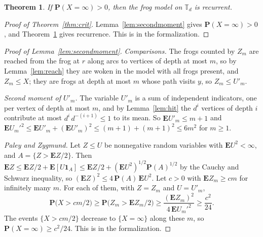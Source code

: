 \documentclass[11pt]{amsart}
\newtheorem{theorem}{Theorem}[section]
\theoremstyle{definition}
\numberwithin{equation}{section}
\newcommand{\lean}[1]{\ignorespaces}
\newcommand{\T}{\mathbb{T}}
\newcommand{\E}{\mathbf{E}}
\renewcommand{\P}{\mathbf{P}}
\newcommand{\one}{\mathbf{1}}
\begin{document}
\begin{theorem}\label{thm:Bzero}\lean{FrogModel.ZeroOne.recurrent_of_frozenCount}
If $\P(X=\infty)>0$, then the frog model on $\T_d$ is recurrent.
\end{theorem}

\begin{proof}[Proof of Theorem~\ref{thm:crit}]
Lemma~\ref{lem:secondmoment} gives $\P(X=\infty)>0$, and Theorem~\ref{thm:Bzero} gives recurrence. This is  in the formalization.
\end{proof}

\begin{proof}[Proof of Lemma~\ref{lem:secondmoment}]
\emph{Comparisons.} The frogs counted by $Z_m$ are reached from the frog at $r$ along arcs to vertices of depth at most $m$, so by Lemma~\ref{lem:reach} they are woken in the model with all frogs present, and $Z_m\le X$; they are frogs at depth at most $m$ whose path visits $y$, so $Z_m\le U'_m$.

\emph{Second moment of $U'_m$.} The variable $U'_m$ is a sum of independent indicators, one per vertex of depth at most $m$, and by Lemma~\ref{lem:hit} the $d^i$ vertices of depth $i$ contribute at most $d^i\,d^{-(i+1)}\le1$ to its mean. So $\E U'_m\le m+1$ and $\E U_m'^2\le\E U'_m+(\E U'_m)^2\le(m+1)+(m+1)^2\le6m^2$ for $m\ge1$.

\emph{Paley and Zygmund.} Let $Z\le U$ be nonnegative random variables with $\E U^2<\infty$, and $A=\{Z>\E Z/2\}$. Then $\E Z\le\E Z/2+\E[U\one_A]\le\E Z/2+(\E U^2)^{1/2}\P(A)^{1/2}$ by the Cauchy and Schwarz inequality, so $(\E Z)^2\le4\,\P(A)\,\E U^2$. Let $c>0$ with $\E Z_m\ge cm$ for infinitely many $m$. For each of them, with $Z=Z_m$ and $U=U'_m$,
\[
\P\bigl(X>cm/2\bigr)\ge\P\bigl(Z_m>\E Z_m/2\bigr)\ge\frac{(\E Z_m)^2}{4\,\E U_m'^2}\ge\frac{c^2}{24}.
\]
The events $\{X>cm/2\}$ decrease to $\{X=\infty\}$ along these $m$, so $\P(X=\infty)\ge c^2/24$. This is  in the formalization.
\end{proof}
\end{document}
